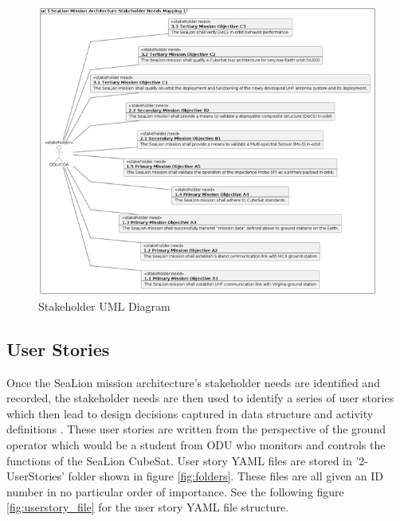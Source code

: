 \documentclass[journal,article,submit,pdftex,moreauthors]{Definitions/mdpi}
\begin{document}
\begin{figure}[H]
    \includegraphics[width=12 cm]{assets/uml_stakeholder.png}
    \caption{Stakeholder UML Diagram}
	\label{fig:uml_stakeholder}
    \end{figure}   
\unskip

\subsection{User Stories}
Once the SeaLion mission architecture's stakeholder needs are identified and recorded, the stakeholder needs are then used to identify a series of user stories which then lead to design decisions captured in data structure and activity definitions \cite{sealion_page}.  These user stories are written from the perspective of the ground operator which would be a student from ODU who monitors and controls the functions of the SeaLion CubeSat.  User story YAML files are stored in '2-UserStories' folder shown in figure \ref{fig:folders}.  These files are all given an ID number in no particular order of importance.  See the following figure \ref{fig:userstory_file} for the user story YAML file structure.
\end{document}
